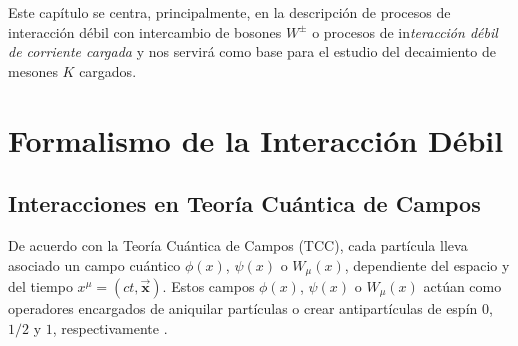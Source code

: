 Este capítulo se centra, principalmente, en la descripción de procesos de interacción débil con intercambio de bosones $W^{\pm}$ o procesos de in\textit{teracción débil de corriente cargada} y nos servirá como base para el estudio del decaimiento de mesones $K$ cargados.

\section{Formalismo de la Interacción Débil}\label{cap:formalism}
\subsection{Interacciones en Teoría Cuántica de Campos}\label{sec:qft}
De acuerdo con la Teoría Cuántica de Campos (TCC), cada partícula lleva asociado un campo cuántico $\phi(x)$, $\psi(x)$ o $W_{\mu}(x)$, dependiente del espacio y del tiempo $x^{\mu}=(ct,\boldsymbol{\vec{x}})$\protect\footnotemark. Estos campos $\phi(x)$, $\psi(x)$ o $W_{\mu}(x)$ actúan como operadores encargados de aniquilar partículas o crear antipartículas de espín $0$, $1/2 $ y $1$, respectivamente \cite{notas2020}.

 
